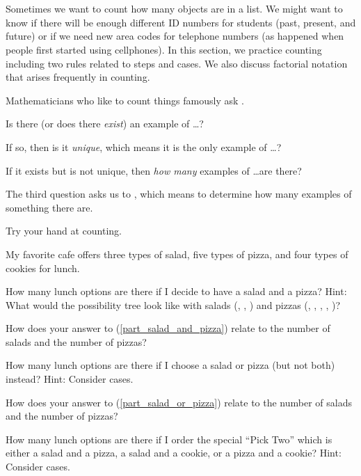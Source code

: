 \section{\seccountingstepscases}
\label{sec_counting_steps_cases}

Sometimes we want to count how many objects are in a list.  We might want to know if there will be enough different ID numbers for students (past, present, and future) or if we need new area codes for telephone numbers (as happened when people first started using cellphones).  In this section, we practice counting including two rules related to steps and cases.  We also discuss factorial notation that arises frequently in counting.

Mathematicians who like to count things famously ask .
\begin{bull}
    \item Is there (or does there \emph{exist}) an example of \ldots?
    \item If so, then is it \emph{unique}, which means it is the only example of \ldots?
    \item If it exists but is not unique, then \emph{how many} examples of \ldots are there?
\end{bull}

The third question asks us to , which means to determine how many examples of something there are.  

Try your hand at counting.

\begin{act} [Lunch]
\label{act_lunch}
    My favorite cafe offers three types of salad, five types of pizza, and four types of cookies for lunch.
    \begin{actpart}
        \item \label{part_salad_and_pizza} How many lunch options are there if I decide to have a salad and a pizza? Hint: What would the possibility tree look like with salads (, , ) and pizzas (, , , , )?  
        \item How does your answer to (\ref{part_salad_and_pizza}) relate to the number of salads and the number of pizzas?
        \item \label{part_salad_or_pizza} How many lunch options are there if I choose a salad or pizza (but not both) instead? Hint: Consider cases.
        \item How does your answer to (\ref{part_salad_or_pizza}) relate to the number of salads and the number of pizzas?
        \item \label{part_pick_two} How many lunch options are there if I order the special ``Pick Two'' which is either a salad and a pizza, a salad and a cookie, or a pizza and a cookie?  Hint: Consider cases.
    \end{actpart}
\end{act}

